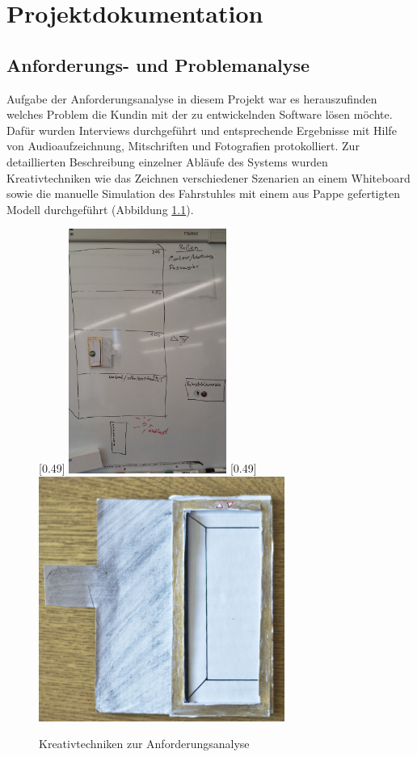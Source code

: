 \part{Projektdokumentation}

\chapter{Anforderungs- und Problemanalyse}
Aufgabe der Anforderungsanalyse in diesem Projekt war es herauszufinden welches Problem die Kundin mit der zu entwickelnden Software lösen möchte. Dafür wurden Interviews durchgeführt und entsprechende Ergebnisse mit Hilfe von Audioaufzeichnung, Mitschriften und Fotografien protokolliert. Zur detaillierten Beschreibung einzelner Abläufe des Systems wurden Kreativtechniken wie das Zeichnen verschiedener Szenarien an einem Whiteboard sowie die manuelle Simulation des Fahrstuhles mit einem aus Pappe gefertigten Modell durchgeführt (Abbildung \ref{creativ}).
\begin{figure}[hbt]
\hspace*{-1.2cm}
[0.49\linewidth]
{\includegraphics[height=8cm]{images/kundengespraech1.jpg}}
[0.49\linewidth]
{\includegraphics[height=8cm]{images/pappfahrstuhl.jpg}}
\caption{Kreativtechniken zur Anforderungsanalyse}
\label{creativ}
\end{figure}
